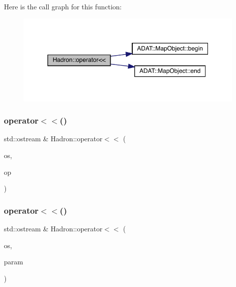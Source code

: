 Here is the call graph for this function\+:\nopagebreak
\begin{figure}[H]
\begin{center}
\leavevmode
\includegraphics[width=344pt]{d1/daf/namespaceHadron_a800dbac093bd07f370068965de5868b3_cgraph}
\end{center}
\end{figure}
\mbox{\label{namespaceHadron_a7b979b64d9a0ab8025031a090f9494c0}} 
\subsubsection{\texorpdfstring{operator$<$$<$()}{operator<<()}\hspace{0.1cm}{\footnotesize\ttfamily [45/48]}}
{\footnotesize\ttfamily std\+::ostream \& Hadron\+::operator$<$$<$ (\begin{DoxyParamCaption}\item[{std\+::ostream \&}]{os,  }\item[{const \mbox{\hyperlink{structHadron_1_1SingleHadronQuarkFlavor__t}{Single\+Hadron\+Quark\+Flavor\+\_\+t}} \&}]{op }\end{DoxyParamCaption})}

\mbox{\label{namespaceHadron_a4ff4eac2687982e6a251bf3524940b01}} 
\subsubsection{\texorpdfstring{operator$<$$<$()}{operator<<()}\hspace{0.1cm}{\footnotesize\ttfamily [46/48]}}
{\footnotesize\ttfamily std\+::ostream \& Hadron\+::operator$<$$<$ (\begin{DoxyParamCaption}\item[{std\+::ostream \&}]{os,  }\item[{const \mbox{\hyperlink{classHadron_1_1HadronDistOperatorRep__t}{Hadron\+Dist\+Operator\+Rep\+\_\+t}} \&}]{param }\end{DoxyParamCaption})}



